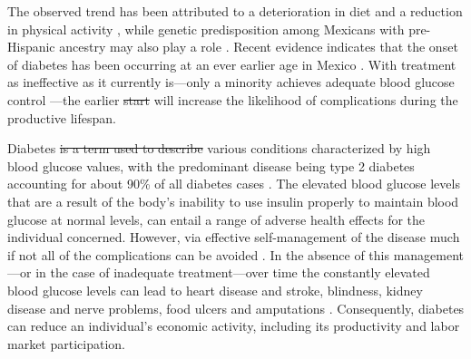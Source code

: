 \documentclass[12pt,english]{article}
\providecommand{\DIFaddtex}[1]{{\protect\color{blue}\uwave{#1}}} %
\providecommand{\DIFdeltex}[1]{{\protect\color{red}\sout{#1}}}                      %
\providecommand{\DIFaddbegin}{} %
\providecommand{\DIFaddend}{} %
\providecommand{\DIFdelbegin}{} %
\providecommand{\DIFdelend}{} %
\providecommand{\DIFadd}[1]{\texorpdfstring{\DIFaddtex{#1}}{#1}} %
\providecommand{\DIFdel}[1]{\texorpdfstring{\DIFdeltex{#1}}{}} %
\begin{document}
The observed trend has been attributed to a deterioration in diet and a reduction in physical activity \parencite{Barquera2008b,Basu2013}, while genetic predisposition among Mexicans with pre-Hispanic ancestry may also play a role \parencite{Williams2013}. Recent evidence indicates that the onset of diabetes has been occurring at an ever earlier age in Mexico \DIFdelbegin %
\DIFdelend \DIFaddbegin \parencite{Bello-Chavolla2017a}\DIFaddend . With treatment as ineffective as it currently is---only a minority achieves adequate blood glucose control \parencite{Barquera2013}---the earlier \DIFdelbegin \DIFdel{start }\DIFdelend \DIFaddbegin \DIFadd{onset }\DIFaddend will increase the likelihood of complications during the productive lifespan. 

Diabetes \DIFdelbegin \DIFdel{is a term used to describe }\DIFdelend \DIFaddbegin \DIFadd{describes }\DIFaddend various conditions characterized by high blood glucose values, with the predominant disease being type 2 diabetes accounting for about 90\% of all diabetes cases \parencite{Sicree2009}. The elevated
blood glucose levels that are a result of the body's inability to use insulin properly to maintain blood glucose at normal levels, can entail a range of adverse health effects for the individual concerned. However, via effective self-management of the disease much if not all of the complications can be avoided \parencite{Lim2011, Gregg2012}. In the absence of this management---or in the case of inadequate treatment---over time the constantly elevated blood glucose levels can lead to heart disease and stroke, blindness, kidney disease and nerve problems, food ulcers and amputations \parencite{Reynoso-Noveron2011}. Consequently, diabetes can reduce an individual's economic activity, including its productivity and labor market participation.
\end{document}
